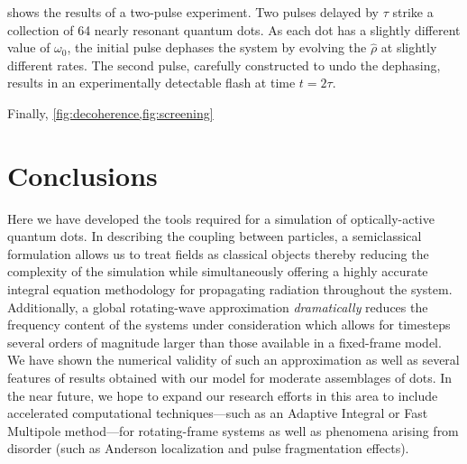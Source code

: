 \documentclass[conference]{IEEEtran}
\begin{document}
 shows the results of a two-pulse experiment.
Two pulses delayed by $\tau$ strike a collection of 64 nearly resonant quantum dots.
As each dot has a slightly different value of $\omega_0$, the initial pulse dephases the system by evolving the $\hat{\rho}$ at slightly different rates.
The second pulse, carefully constructed to undo the dephasing, results in an experimentally detectable flash at time $t = 2\tau$.

Finally, \cref{fig:decoherence,fig:screening}

\section{Conclusions}
Here we have developed the tools required for a simulation of optically-active quantum dots.
In describing the coupling between particles, a semiclassical formulation allows us to treat fields as classical objects thereby reducing the complexity of the simulation while simultaneously offering a highly accurate integral equation methodology for propagating radiation throughout the system.
Additionally, a global rotating-wave approximation \emph{dramatically} reduces the frequency content of the systems under consideration which allows for timesteps several orders of magnitude larger than those available in a fixed-frame model.
We have shown the numerical validity of such an approximation as well as several features of results obtained with our model for moderate assemblages of dots.
In the near future, we hope to expand our research efforts in this area to include accelerated computational techniques---such as an Adaptive Integral\cite{Bleszynski1996} or Fast Multipole method\cite{Greengard1987}---for rotating-frame systems as well as phenomena arising from disorder (such as Anderson localization and pulse fragmentation effects).


{}

\end{document}
